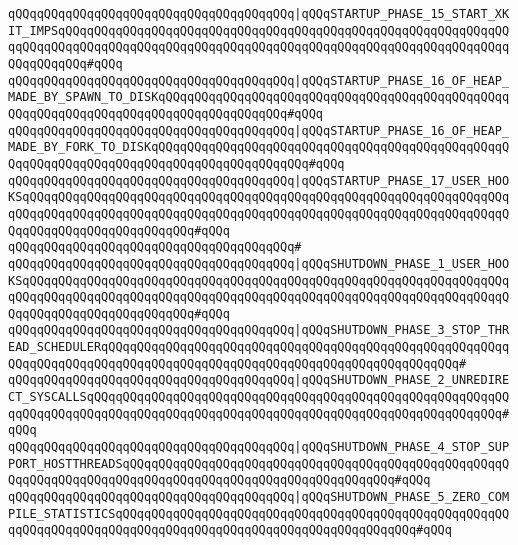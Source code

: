 \verb|qQQqqQQqqQQqqQQqqQQqqQQqqQQqqQQqqQQqqQQq|\verb#|qQQqSTARTUP_PHASE_15_START_XKIT_IMPSqQQqqQQqqQQqqQQqqQQqqQQqqQQqqQQqqQQqqQQqqQQqqQQqqQQqqQQqqQQqqQQqqQQqqQQqqQQqqQQqqQQqqQQqqQQqqQQqqQQqqQQqqQQqqQQqqQQqqQQqqQQqqQQqqQQqqQQqqQQqqQQq#\verb|#qQQq|\newline
\verb|qQQqqQQqqQQqqQQqqQQqqQQqqQQqqQQqqQQqqQQq|\verb#|qQQqSTARTUP_PHASE_16_OF_HEAP_MADE_BY_SPAWN_TO_DISKqQQqqQQqqQQqqQQqqQQqqQQqqQQqqQQqqQQqqQQqqQQqqQQqqQQqqQQqqQQqqQQqqQQqqQQqqQQqqQQqqQQqqQQq#\verb|#qQQq|\newline
\verb|qQQqqQQqqQQqqQQqqQQqqQQqqQQqqQQqqQQqqQQq|\verb#|qQQqSTARTUP_PHASE_16_OF_HEAP_MADE_BY_FORK_TO_DISKqQQqqQQqqQQqqQQqqQQqqQQqqQQqqQQqqQQqqQQqqQQqqQQqqQQqqQQqqQQqqQQqqQQqqQQqqQQqqQQqqQQqqQQqqQQq#\verb|#qQQq|\newline
\verb|qQQqqQQqqQQqqQQqqQQqqQQqqQQqqQQqqQQqqQQq|\verb#|qQQqSTARTUP_PHASE_17_USER_HOOKSqQQqqQQqqQQqqQQqqQQqqQQqqQQqqQQqqQQqqQQqqQQqqQQqqQQqqQQqqQQqqQQqqQQqqQQqqQQqqQQqqQQqqQQqqQQqqQQqqQQqqQQqqQQqqQQqqQQqqQQqqQQqqQQqqQQqqQQqqQQqqQQqqQQqqQQqqQQqqQQqqQQq#\verb|#qQQq|\newline
\verb|qQQqqQQqqQQqqQQqqQQqqQQqqQQqqQQqqQQqqQQq#|\newline
\verb|qQQqqQQqqQQqqQQqqQQqqQQqqQQqqQQqqQQqqQQq|\verb#|qQQqSHUTDOWN_PHASE_1_USER_HOOKSqQQqqQQqqQQqqQQqqQQqqQQqqQQqqQQqqQQqqQQqqQQqqQQqqQQqqQQqqQQqqQQqqQQqqQQqqQQqqQQqqQQqqQQqqQQqqQQqqQQqqQQqqQQqqQQqqQQqqQQqqQQqqQQqqQQqqQQqqQQqqQQqqQQqqQQqqQQqqQQqqQQq#\verb|#qQQq|\newline
\verb|qQQqqQQqqQQqqQQqqQQqqQQqqQQqqQQqqQQqqQQq|\verb#|qQQqSHUTDOWN_PHASE_3_STOP_THREAD_SCHEDULERqQQqqQQqqQQqqQQqqQQqqQQqqQQqqQQqqQQqqQQqqQQqqQQqqQQqqQQqqQQqqQQqqQQqqQQqqQQqqQQqqQQqqQQqqQQqqQQqqQQqqQQqqQQqqQQqqQQqqQQq#\verb|#|\newline
\verb|qQQqqQQqqQQqqQQqqQQqqQQqqQQqqQQqqQQqqQQq|\verb#|qQQqSHUTDOWN_PHASE_2_UNREDIRECT_SYSCALLSqQQqqQQqqQQqqQQqqQQqqQQqqQQqqQQqqQQqqQQqqQQqqQQqqQQqqQQqqQQqqQQqqQQqqQQqqQQqqQQqqQQqqQQqqQQqqQQqqQQqqQQqqQQqqQQqqQQqqQQqqQQqqQQq#\verb|#qQQq|\newline
\verb|qQQqqQQqqQQqqQQqqQQqqQQqqQQqqQQqqQQqqQQq|\verb#|qQQqSHUTDOWN_PHASE_4_STOP_SUPPORT_HOSTTHREADSqQQqqQQqqQQqqQQqqQQqqQQqqQQqqQQqqQQqqQQqqQQqqQQqqQQqqQQqqQQqqQQqqQQqqQQqqQQqqQQqqQQqqQQqqQQqqQQqqQQqqQQqqQQq#\verb|#qQQq|\newline
\verb|qQQqqQQqqQQqqQQqqQQqqQQqqQQqqQQqqQQqqQQq|\verb#|qQQqSHUTDOWN_PHASE_5_ZERO_COMPILE_STATISTICSqQQqqQQqqQQqqQQqqQQqqQQqqQQqqQQqqQQqqQQqqQQqqQQqqQQqqQQqqQQqqQQqqQQqqQQqqQQqqQQqqQQqqQQqqQQqqQQqqQQqqQQqqQQqqQQq#\verb|#qQQq|\newline
